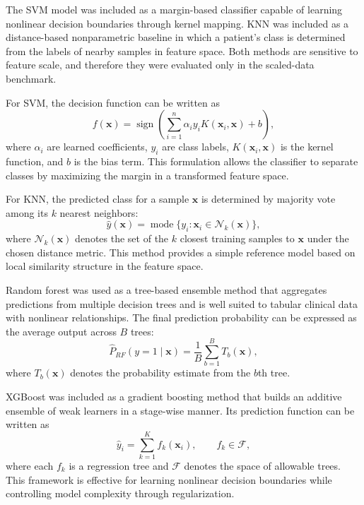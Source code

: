 The SVM model was included as a margin-based classifier capable of learning nonlinear decision boundaries through kernel mapping. KNN was included as a distance-based nonparametric baseline in which a patient's class is determined from the labels of nearby samples in feature space. Both methods are sensitive to feature scale, and therefore they were evaluated only in the scaled-data benchmark.

For SVM, the decision function can be written as
\begin{equation}
f(\mathbf{x}) = \operatorname{sign}\left(\sum_{i=1}^{n}\alpha_i y_i K(\mathbf{x}_i,\mathbf{x}) + b\right),
\end{equation}
where $\alpha_i$ are learned coefficients, $y_i$ are class labels, $K(\mathbf{x}_i,\mathbf{x})$ is the kernel function, and $b$ is the bias term. This formulation allows the classifier to separate classes by maximizing the margin in a transformed feature space.

For KNN, the predicted class for a sample $\mathbf{x}$ is determined by majority vote among its $k$ nearest neighbors:
\begin{equation}
\hat{y}(\mathbf{x}) = \operatorname{mode}\{y_i : \mathbf{x}_i \in \mathcal{N}_k(\mathbf{x})\},
\end{equation}
where $\mathcal{N}_k(\mathbf{x})$ denotes the set of the $k$ closest training samples to $\mathbf{x}$ under the chosen distance metric. This method provides a simple reference model based on local similarity structure in the feature space.

Random forest was used as a tree-based ensemble method that aggregates predictions from multiple decision trees and is well suited to tabular clinical data with nonlinear relationships. The final prediction probability can be expressed as the average output across $B$ trees:
\begin{equation}
\hat{P}_{RF}(y=1 \mid \mathbf{x}) = \frac{1}{B}\sum_{b=1}^{B} T_b(\mathbf{x}),
\end{equation}
where $T_b(\mathbf{x})$ denotes the probability estimate from the $b$th tree.

XGBoost was included as a gradient boosting method that builds an additive ensemble of weak learners in a stage-wise manner. Its prediction function can be written as
\begin{equation}
\hat{y}_i = \sum_{k=1}^{K} f_k(\mathbf{x}_i), \qquad f_k \in \mathcal{F},
\end{equation}
where each $f_k$ is a regression tree and $\mathcal{F}$ denotes the space of allowable trees. This framework is effective for learning nonlinear decision boundaries while controlling model complexity through regularization.

